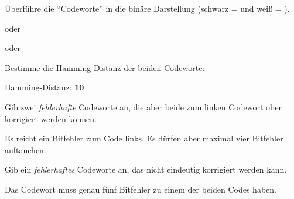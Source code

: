 \documentclass[10pt, a4paper]{scrartcl}
\begin{document}
\begin{aufgabe}
	Überführe die \enquote{Codeworte} in die binäre Darstellung (schwarz =  und weiß = ).
	
	\begin{multicols}{2}\centering
	
	\end{multicols}
\end{aufgabe}
\begin{loesung}
	\begin{multicols}{2}\centering
	\underline{}
	
	oder
	
	\underline{}
	
	\underline{}
	
	oder
	
	\underline{}
	\end{multicols}
\end{loesung}

\begin{aufgabe}
	Bestimme die Hamming-Distanz der beiden Codeworte: \luecke{2cm}
\end{aufgabe}
\begin{loesung}
	Hamming-Distanz: \textbf{10}
\end{loesung}

\begin{aufgabe}
	Gib zwei \emph{fehlerhafte} Codeworte an, die aber beide zum linken Codewort oben korrigiert werden können.
	\begin{multicols}{2}\centering
	
	\end{multicols}
\end{aufgabe}
\begin{loesung}
	Es reicht ein Bitfehler zum Code links. Es dürfen aber maximal vier Bitfehler auftauchen.
\end{loesung}

\begin{aufgabe}
	Gib ein \emph{fehlerhaftes} Codeworte an, das nicht eindeutig korrigiert werden kann.
	
	\begin{center}
	\end{center}
\end{aufgabe}
\begin{loesung}
	Das Codewort muss genau fünf Bitfehler zu einem der beiden Codes haben.
\end{loesung}
\end{document}
